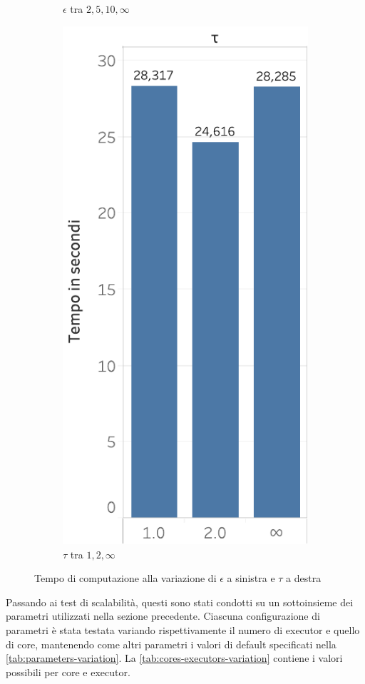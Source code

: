 \begin{figure}
\begin{subfigure}{.5\textwidth}
   \caption{\(\epsilon\) tra \(2,5,10,\infty\)}
  \label{fig:chap-4:TimeEpsilon}
\end{subfigure}%
\begin{subfigure}{.5\textwidth}
  \centering
   \includegraphics[scale=0.5]{res/fig/sec-4/performance/TimeTau.pdf}
   \caption{\(\tau\) tra \(1,2,\infty\)}%
  \label{fig:chap-4:TimeTau}
  \end{subfigure}%
  \caption{Tempo di computazione alla variazione di \(\epsilon\) a sinistra e \(\tau\) a destra}%
  \label{fig:chap-4:TimeEpsilonAndTau}
\end{figure}

Passando ai test di scalabilità, questi sono stati condotti su un sottoinsieme dei parametri utilizzati nella sezione precedente.
Ciascuna configurazione di parametri è stata testata variando rispettivamente il numero di executor  e quello di core, mantenendo come altri parametri i valori di default specificati nella \cref{tab:parameters-variation}.
La \cref{tab:cores-executors-variation} contiene i valori possibili per core e executor.

